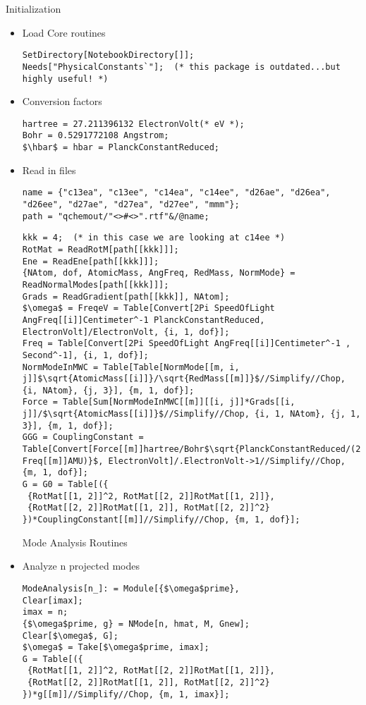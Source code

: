 \large{Initialization}
\begin{itemize}[leftmargin = *]
\item Load Core routines
\begin{lstlisting}
SetDirectory[NotebookDirectory[]];
Needs["PhysicalConstants`"];  (* this package is outdated...but highly useful! *)
\end{lstlisting}

\item Conversion factors
\begin{lstlisting}
hartree = 27.211396132 ElectronVolt(* eV *);
Bohr = 0.5291772108 Angstrom;
$\hbar$ = hbar = PlanckConstantReduced;
\end{lstlisting}

\item Read in files
\begin{lstlisting}
name = {"c13ea", "c13ee", "c14ea", "c14ee", "d26ae", "d26ea", "d26ee", "d27ae", "d27ea", "d27ee", "mmm"};
path = "qchemout/"<>#<>".rtf"&/@name;
\end{lstlisting}
\begin{lstlisting}
kkk = 4;  (* in this case we are looking at c14ee *)
RotMat = ReadRotM[path[[kkk]]];
Ene = ReadEne[path[[kkk]]];
{NAtom, dof, AtomicMass, AngFreq, RedMass, NormMode} = ReadNormalModes[path[[kkk]]];
Grads = ReadGradient[path[[kkk]], NAtom];
$\omega$ = FreqeV = Table[Convert[2Pi SpeedOfLight AngFreq[[i]]Centimeter^-1 PlanckConstantReduced, ElectronVolt]/ElectronVolt, {i, 1, dof}];
Freq = Table[Convert[2Pi SpeedOfLight AngFreq[[i]]Centimeter^-1 , Second^-1], {i, 1, dof}];
NormModeInMWC = Table[Table[NormMode[[m, i, j]]$\sqrt{AtomicMass[[i]]}/\sqrt{RedMass[[m]]}$//Simplify//Chop, {i, NAtom}, {j, 3}], {m, 1, dof}];
Force = Table[Sum[NormModeInMWC[[m]][[i, j]]*Grads[[i, j]]/$\sqrt{AtomicMass[[i]]}$//Simplify//Chop, {i, 1, NAtom}, {j, 1, 3}], {m, 1, dof}];
GGG = CouplingConstant = Table[Convert[Force[[m]]hartree/Bohr$\sqrt{PlanckConstantReduced/(2 Freq[[m]]AMU)}$, ElectronVolt]/.ElectronVolt->1//Simplify//Chop, {m, 1, dof}];
G = G0 = Table[({
 {RotMat[[1, 2]]^2, RotMat[[2, 2]]RotMat[[1, 2]]},
 {RotMat[[2, 2]]RotMat[[1, 2]], RotMat[[2, 2]]^2}
})*CouplingConstant[[m]]//Simplify//Chop, {m, 1, dof}];
\end{lstlisting}
\large{Mode Analysis Routines}
\item Analyze n projected modes
\begin{lstlisting}
ModeAnalysis[n_]: = Module[{$\omega$prime},
Clear[imax];
imax = n;
{$\omega$prime, g} = NMode[n, hmat, M, Gnew];
Clear[$\omega$, G];
$\omega$ = Take[$\omega$prime, imax];
G = Table[({
 {RotMat[[1, 2]]^2, RotMat[[2, 2]]RotMat[[1, 2]]},
 {RotMat[[2, 2]]RotMat[[1, 2]], RotMat[[2, 2]]^2}
})*g[[m]]//Simplify//Chop, {m, 1, imax}];


\end{lstlisting}
\end{itemize}
